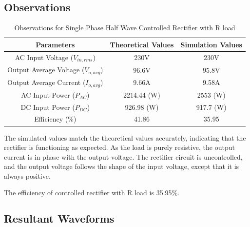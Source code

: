 \subsection{Observations}

\begin{table}[h]
    \renewcommand{\arraystretch}{1.3}
    \label{table_observation_5}
    \centering
    \begin{tabular}{|c|c|c|}
        \hline
        Parameters                              & Theoretical Values & Simulation Values \\
        \hline
        \hline
        AC Input Voltage ($ V_{in,rms} $)       & 230V               & 230V              \\
        \hline
        Output Average Voltage ($ V_{o,avg} $)  & 96.6V              & 95.8V            \\
        \hline
        Output Average Current ($ I_{o,avg}  $) & 9.66A              & 9.58A             \\
        \hline
        AC Input Power ($ P_{AC}  $)            & 2214.44 (W)        & 2553 (W)          \\
        \hline
        DC Input Power ($ P_{DC}  $)            & 926.98 (W)         & 917.7 (W)         \\
        \hline
        Efficiency (\%)                         & 41.86              & 35.95             \\
        \hline
    \end{tabular}
    \caption{Observations for Single Phase Half Wave Controlled Rectifier with R load}

\end{table}


 The simulated values match the theoretical values accurately, indicating that the rectifier is functioning as expected. As the load is purely resistive, the output current is in phase with the output voltage. The rectifier circuit is uncontrolled, and the output voltage follows the shape of the input voltage, except that it is always positive.

The efficiency of controlled rectifier with R load is 35.95\%.

\pagebreak


\subsection{Resultant Waveforms}

